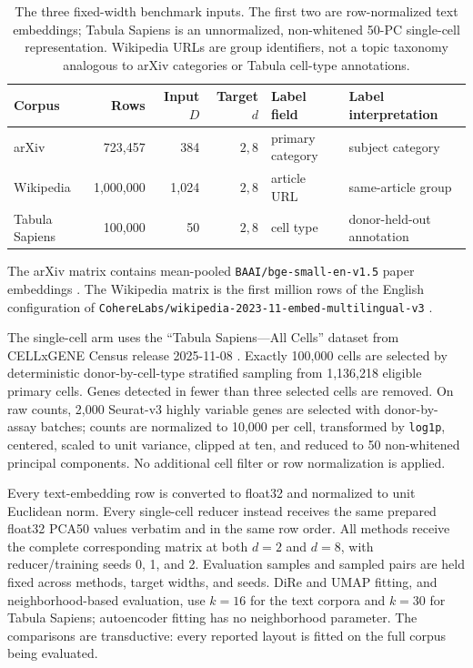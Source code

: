 \documentclass[10pt]{article}
\begin{document}
\begin{table}[H]
\centering
\small
\begin{tabular}{lrrrll}
\toprule
Corpus & Rows & Input $D$ & Target $d$ & Label field & Label interpretation\\
\midrule
arXiv & 723,457 & 384 & $2,8$ & primary category & subject category\\
Wikipedia & 1,000,000 & 1,024 & $2,8$ & article URL & same-article group\\
Tabula Sapiens & 100,000 & 50 & $2,8$ & cell type & donor-held-out annotation\\
\bottomrule
\end{tabular}
\caption{The three fixed-width benchmark inputs.  The first two are row-normalized text
embeddings; Tabula Sapiens is an unnormalized, non-whitened 50-PC single-cell
representation.  Wikipedia URLs are group identifiers, not a topic taxonomy analogous
to arXiv categories or Tabula cell-type annotations.}
\label{tab:data}
\end{table}

The arXiv matrix contains mean-pooled \texttt{BAAI/bge-small-en-v1.5} paper
embeddings \cite{bge}.  The Wikipedia matrix is the first million rows of the English
configuration of \texttt{CohereLabs/wikipedia-2023-11-embed-multilingual-v3}
\cite{coherewiki}.

The single-cell arm uses the ``Tabula Sapiens---All Cells'' dataset from CELLxGENE
Census release 2025-11-08 \cite{tabulasapiens,cellxgenecensus}.  Exactly 100,000 cells
are selected by deterministic donor-by-cell-type stratified sampling from 1,136,218
eligible primary cells.  Genes detected in fewer than three selected cells are removed.
On raw counts, 2,000 Seurat-v3 highly variable genes are selected with
donor-by-assay batches; counts are normalized to 10,000 per cell, transformed by
\texttt{log1p}, centered, scaled to unit variance, clipped at ten, and reduced to 50
non-whitened principal components.  No additional cell filter or row normalization is
applied.

Every text-embedding row is converted to float32 and normalized to unit Euclidean norm.
Every single-cell reducer instead receives the same prepared float32 PCA50 values
verbatim and in the same row order.  All methods receive the complete corresponding
matrix at both $d=2$ and $d=8$, with reducer/training seeds 0, 1, and 2.  Evaluation
samples and sampled pairs are held fixed across methods, target widths, and seeds.
DiRe and UMAP fitting, and neighborhood-based evaluation, use $k=16$ for the text
corpora and $k=30$ for Tabula Sapiens; autoencoder fitting has no neighborhood
parameter.  The comparisons are transductive: every reported layout is fitted on the
full corpus being evaluated.
\end{document}
